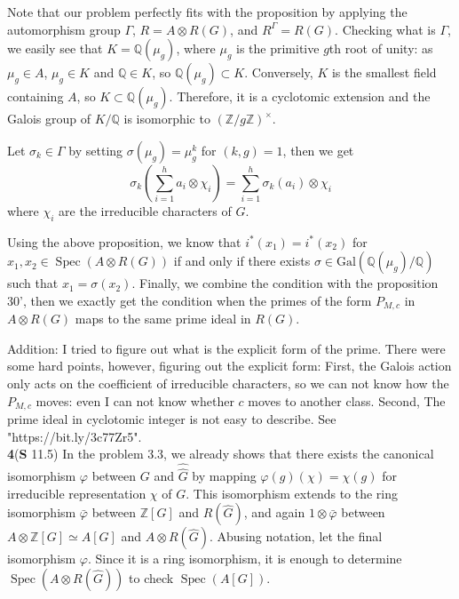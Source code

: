 \documentclass[a4paper, 12pt]{article}
\theoremstyle{Mydefinition}
\theoremstyle{Mytheorem}
\DeclareMathOperator{\Spec}{Spec}
\begin{document}
Note that our problem perfectly fits with the proposition by applying the automorphism group $\Gamma$, $R = A\otimes R(G)$, and $R^{\Gamma} = R(G)$. Checking what is $\Gamma$, we easily see that $K = \mathbb{Q}(\mu_g)$, where $\mu_g$ is the primitive $g$th root of unity: as $\mu_g\in A$, $\mu_g\in K$ and $\mathbb{Q}\in K$, so $\mathbb{Q}(\mu_g)\subset K$. Conversely, $K$ is the smallest field containing $A$, so $K\subset \mathbb{Q}(\mu_g)$. Therefore, it is a cyclotomic extension and the Galois group of $K/\mathbb{Q}$ is isomorphic to $(\mathbb{Z}/g\mathbb{Z})^\times$.

Let $\sigma_k\in \Gamma$ by setting $\sigma(\mu_g) = \mu_g^k$ for $(k,g)=1$, then we get
\begin{equation}
    \sigma_k\left(\sum_{i=1}^h a_i\otimes \chi_i\right) = \sum_{i=1}^h \sigma_k(a_i)\otimes \chi_i
\end{equation}
where $\chi_i$ are the irreducible characters of $G$.

Using the above proposition, we know that $i^*(x_1)=i^*(x_2)$ for $x_1,x_2\in \Spec(A\otimes R(G))$ if and only if there exists $\sigma\in \mathrm{Gal}(\mathbb{Q}(\mu_g)/\mathbb{Q})$ such that $x_1 = \sigma(x_2)$. Finally, we combine the condition with the proposition 30', then we exactly get the condition when the primes of the form $P_{M,c}$ in $A\otimes R(G)$ maps to the same prime ideal in $R(G)$.

Addition: I tried to figure out what is the explicit form of the prime. There were some hard points, however, figuring out the explicit form: First, the Galois action only acts on the coefficient of irreducible characters, so we can not know how the $P_{M,c}$ moves: even I can not know whether $c$ moves to another class. Second, The prime ideal in cyclotomic integer is not easy to describe. See "https://bit.ly/3c77Zr5".\\

\noindent \textbf{4}(\textbf{S} 11.5)
In the problem 3.3, we already shows that there exists the canonical isomorphism $\varphi$ between $G$ and $\hat{\hat{G}}$ by mapping $\varphi(g)(\chi) = \chi(g)$ for irreducible representation $\chi$ of $G$. This isomorphism extends to the ring isomorphism $\bar{\varphi}$ between $\mathbb{Z}[G]$ and $R(\hat{G})$, and again $1\otimes \bar{\varphi}$ between $A\otimes \mathbb{Z}[G]\simeq A[G]$ and $A\otimes R(\hat{G})$. Abusing notation, let the final isomorphism $\varphi$. Since it is a ring isomorphism, it is enough to determine $\Spec(A\otimes R(\hat{G}))$ to check $\Spec(A[G])$.
\end{document}
